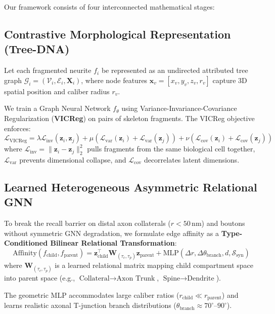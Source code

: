 \documentclass[10pt,twocolumn,letterpaper]{article}
\begin{document}
Our framework consists of four interconnected mathematical stages:

\subsection{Contrastive Morphological Representation (Tree-DNA)}
Let each fragmented neurite $f_i$ be represented as an undirected attributed tree graph $\mathcal{G}_i = (\mathcal{V}_i, \mathcal{E}_i, \mathbf{X}_i)$, where node features $\mathbf{x}_v = [x_v, y_v, z_v, r_v]$ capture 3D spatial position and caliber radius $r_v$.

We train a Graph Neural Network $f_\theta$ using Variance-Invariance-Covariance Regularization (\textbf{VICReg}) \cite{bardes2022} on pairs of skeleton fragments. The VICReg objective enforces:
\begin{equation}
\mathcal{L}_{\text{VICReg}} = \lambda \mathcal{L}_{\text{inv}}(\mathbf{z}_i, \mathbf{z}_j) + \mu (\mathcal{L}_{\text{var}}(\mathbf{z}_i) + \mathcal{L}_{\text{var}}(\mathbf{z}_j)) + \nu (\mathcal{L}_{\text{cov}}(\mathbf{z}_i) + \mathcal{L}_{\text{cov}}(\mathbf{z}_j))
\end{equation}
where $\mathcal{L}_{\text{inv}} = \|\mathbf{z}_i - \mathbf{z}_j\|_2^2$ pulls fragments from the same biological cell together, $\mathcal{L}_{\text{var}}$ prevents dimensional collapse, and $\mathcal{L}_{\text{cov}}$ decorrelates latent dimensions.

\subsection{Learned Heterogeneous Asymmetric Relational GNN}
To break the recall barrier on distal axon collaterals ($r < 50\,\text{nm}$) and boutons without symmetric GNN degradation, we formulate edge affinity as a \textbf{Type-Conditioned Bilinear Relational Transformation}:
\begin{equation}
\text{Affinity}(f_{\text{child}}, f_{\text{parent}}) = \mathbf{z}_{\text{child}}^\top \mathbf{W}_{(\tau_c, \tau_p)} \mathbf{z}_{\text{parent}} + \text{MLP}(\Delta r, \Delta \theta_{\text{branch}}, d, \mathcal{S}_{\text{syn}})
\end{equation}
where $\mathbf{W}_{(\tau_c, \tau_p)}$ is a learned relational matrix mapping child compartment space into parent space (e.g., $\text{Collateral} \to \text{Axon Trunk}$, $\text{Spine} \to \text{Dendrite}$). 

The geometric MLP accommodates large caliber ratios ($r_{\text{child}} \ll r_{\text{parent}}$) and learns realistic axonal T-junction branch distributions ($\theta_{\text{branch}} \approx 70^\circ\text{--}90^\circ$).
\end{document}
